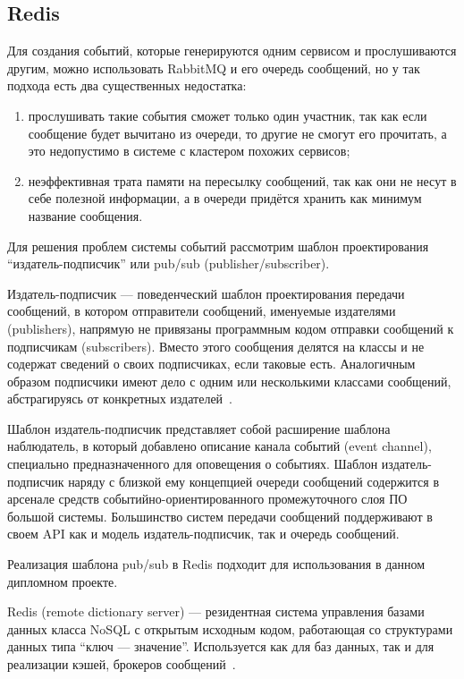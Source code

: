 \subsection{Redis}

Для создания событий, которые генерируются одним сервисом и прослушиваются другим, можно использовать RabbitMQ и его очередь сообщений, но у так подхода есть два существенных недостатка:
\begin{enumerate}
    \item прослушивать такие события сможет только один участник, так как если сообщение будет вычитано из очереди, то другие не смогут его прочитать, а это недопустимо в системе с кластером похожих сервисов;
    \item неэффективная трата памяти на пересылку сообщений, так как они не несут в себе полезной информации, а в очереди придётся хранить как минимум название сообщения.
\end{enumerate}

Для решения проблем системы событий рассмотрим шаблон проектирования ``издатель-подписчик'' или pub/sub (publisher/subscriber).

Издатель-подписчик — поведенческий шаблон проектирования передачи сообщений, в котором отправители сообщений, именуемые издателями (publishers), напрямую не привязаны программным кодом отправки сообщений к подписчикам (subscribers). Вместо этого сообщения делятся на классы и не содержат сведений о своих подписчиках, если таковые есть. Аналогичным образом подписчики имеют дело с одним или несколькими классами сообщений, абстрагируясь от конкретных издателей~\cite{patterns}.

Шаблон издатель-подписчик представляет собой расширение шаблона наблюдатель, в который добавлено описание канала событий (event channel), специально предназначенного для оповещения о событиях. Шаблон издатель-подписчик наряду с близкой ему концепцией очереди сообщений содержится в арсенале средств событийно-ориентированного промежуточного слоя ПО большой системы. Большинство систем передачи сообщений поддерживают в своем API как и модель издатель-подписчик, так и очередь сообщений.

Реализация шаблона pub/sub в Redis подходит для использования в данном дипломном проекте.

Redis (remote dictionary server) — резидентная система управления базами данных класса NoSQL с открытым исходным кодом, работающая со структурами данных типа ``ключ — значение''. Используется как для баз данных, так и для реализации кэшей, брокеров сообщений~\cite{redis}.


